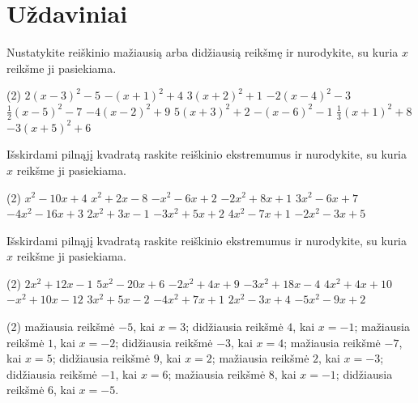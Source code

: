 \documentclass[11pt,a4paper]{scrartcl}
\begin{document}
\section{Uždaviniai}

\begin{problem}
Nustatykite reiškinio mažiausią arba didžiausią reikšmę ir nurodykite, su kuria $x$ reikšme ji pasiekiama.
\begin{tasks}[label={(\arabic*)}, label-offset=0.9em](2)
	\task $2(x-3)^2-5$
	\task $-(x+1)^2+4$
	\task $3(x+2)^2+1$
	\task $-2(x-4)^2-3$
	\task $\frac{1}{2}(x-5)^2-7$
	\task $-4(x-2)^2+9$
	\task $5(x+3)^2+2$
	\task $-(x-6)^2-1$
	\task $\frac{1}{3}(x+1)^2+8$
	\task $-3(x+5)^2+6$
\end{tasks}
\end{problem}

\begin{problem}
Išskirdami pilnąjį kvadratą raskite reiškinio ekstremumus ir nurodykite, su kuria $x$ reikšme ji pasiekiama.
\begin{tasks}[label={(\arabic*)}, label-offset=0.9em](2)
	\task $x^2-10x+4$
	\task $x^2+2x-8$
	\task $-x^2-6x+2$
	\task $-2x^2+8x+1$
	\task $3x^2-6x+7$
	\task $-4x^2-16x+3$
	\task $2x^2+3x-1$
	\task $-3x^2+5x+2$
	\task $4x^2-7x+1$
	\task $-2x^2-3x+5$
\end{tasks}
\end{problem}

\begin{problem}
Išskirdami pilnąjį kvadratą raskite reiškinio ekstremumus ir nurodykite, su kuria $x$ reikšme ji pasiekiama.
\begin{tasks}[label={(\arabic*)}, label-offset=0.9em](2)
	\task $2x^2+12x-1$
	\task $5x^2-20x+6$
	\task $-2x^2+4x+9$
	\task $-3x^2+18x-4$
	\task $4x^2+4x+10$
	\task $-x^2+10x-12$
	\task $3x^2+5x-2$
	\task $-4x^2+7x+1$
	\task $2x^2-3x+4$
	\task $-5x^2-9x+2$
\end{tasks}
\end{problem}

\newpage
\answerssection

\begin{problem} \phantom{text}
\begin{tasks}[label={(\arabic*)}, label-offset=0.9em](2)
\task mažiausia reikšmė $-5$, kai $x=3$;
\task didžiausia reikšmė $4$, kai $x=-1$;
\task mažiausia reikšmė $1$, kai $x=-2$;
\task didžiausia reikšmė $-3$, kai $x=4$;
\task mažiausia reikšmė $-7$, kai $x=5$;
\task didžiausia reikšmė $9$, kai $x=2$;
\task mažiausia reikšmė $2$, kai $x=-3$;
\task didžiausia reikšmė $-1$, kai $x=6$;
\task mažiausia reikšmė $8$, kai $x=-1$;
\task didžiausia reikšmė $6$, kai $x=-5$.
\end{tasks}
\end{problem}
\end{document}
